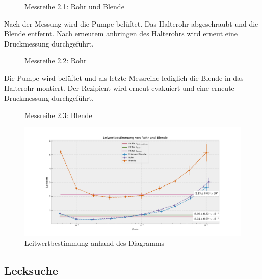 \documentclass[12pt, a4paper]{scrartcl}
\begin{document}
    	\begin{figure}[H]
    		\centering
    		
    		\caption{Messreihe 2.1: Rohr und Blende}
   		\end{figure}
   	
   		Nach der Messung wird die Pumpe belüftet. Das Halterohr abgeschraubt und die Blende entfernt. Nach erneutem anbringen des Halterohrs wird erneut eine Druckmessung durchgeführt.
   	
   		\begin{figure}[H]
   			\centering
   			
   			\caption{Messreihe 2.2: Rohr}
   		\end{figure}
   	
   		Die Pumpe wird belüftet und als letzte Messreihe lediglich die Blende in das Halterohr montiert. Der Rezipient wird erneut evakuiert und eine erneute Druckmessung durchgeführt.
   	
   		\begin{figure}[H]
   			\centering
   			
   			\caption{Messreihe 2.3: Blende}
   		\end{figure}    
   	
  		
   		\begin{landscape}
   			\thispagestyle{empty}
   			\begin{figure}[h!]
   				\hspace*{-40mm}\includegraphics[width=1.8\textwidth]{../25-f1.png}
   				\caption{Leitwertbestimmung anhand des Diagramms}
   			\end{figure}
   		\end{landscape}
   		
    
    
    \subsection{Lecksuche}
    
\end{document}
